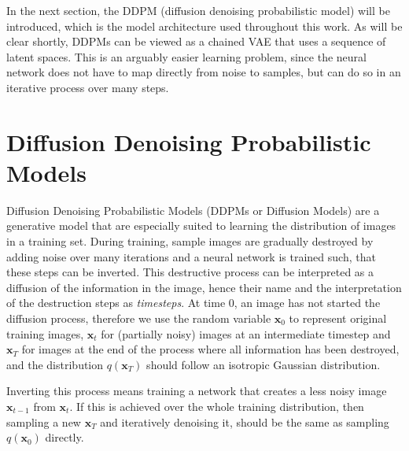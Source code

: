 In the next section, the DDPM (diffusion denoising probabilistic model) will be introduced, which is the model architecture used throughout this work. As will be clear shortly, DDPMs can be viewed as a chained VAE that uses a sequence of latent spaces. This is an arguably easier learning problem, since the neural network does not have to map directly from noise to samples, but can do so in an iterative process over many steps.

\section{Diffusion Denoising Probabilistic Models}
Diffusion Denoising Probabilistic Models (DDPMs or Diffusion Models) are a generative model that are especially suited to learning the distribution of images in a training set. During training, sample images are gradually destroyed by adding noise over many iterations and a neural network is trained such, that these steps can be inverted. This destructive process can be interpreted as a diffusion of the information in the image, hence their name and the interpretation of the destruction steps as \textit{timesteps}. At time $0$, an image has not started the diffusion process, therefore we use the random variable $\bm{x}_0$ to represent original training images, $\bm{x}_t$ for (partially noisy) images at an intermediate timestep and $\bm{x}_T$ for images at the end of the process where all information has been destroyed, and the distribution $q(\bm{x}_T)$ should follow an isotropic Gaussian distribution.

Inverting this process means training a network that creates a less noisy image $\bm{x}_{t-1}$ from $\bm{x}_t$. If this is achieved over the whole training distribution, then sampling a new $\bm{x}_T$ and iteratively denoising it, should be the same as sampling $q(\bm{x}_0)$ directly.

